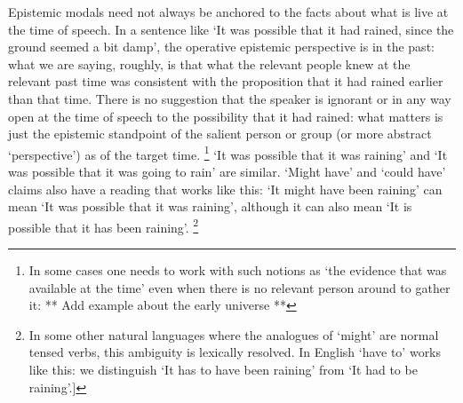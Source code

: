 \documentclass[If.tex]{subfiles}
\begin{document}
Epistemic modals need not always be anchored to the facts about what is live at the time of speech. In a sentence like ‘It was possible that it had rained, since the ground seemed a bit damp’, the operative epistemic perspective is in the past: what we are saying, roughly, is that what the relevant people knew at the relevant past time was consistent with the proposition that it had rained earlier than that time. There is no suggestion that the speaker is ignorant or in any way open at the time of speech to the possibility that it had rained: what matters is just the epistemic standpoint of the salient person or group (or more abstract ‘perspective’) as of the target time.%
\footnote{In some cases one needs to work with such notions as ‘the evidence that was available at the time’ even when there is no relevant person around to gather it: ** Add example about the early universe **}
 ‘It was possible that it was raining’ and ‘It was possible that it was going to rain’ are similar. ‘Might have’ and ‘could have’ claims also have a reading that works like this: ‘It might have been raining’ can mean ‘It was possible that it was raining’, although it can also mean ‘It is possible that it has been raining’.%
\footnote{In some other natural languages where the analogues of ‘might’ are normal tensed verbs, this ambiguity is lexically resolved. In English ‘have to’ works like this: we distinguish ‘It has to have been raining’ from ‘It had to be raining’.{]}}
\end{document}
